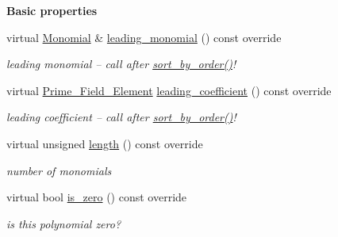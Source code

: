 \begin{Indent}\textbf{ Basic properties}\par
\begin{DoxyCompactItemize}
\item 
\mbox{\label{group__polygroup_ac858fe599295a6b20c2a2df1ead74068}} 
virtual \hyperlink{group__polygroup_class_monomial}{Monomial} \& \hyperlink{group__polygroup_ac858fe599295a6b20c2a2df1ead74068}{leading\+\_\+monomial} () const override
\begin{DoxyCompactList}\small\item\em leading monomial -- call after \hyperlink{group__polygroup_a41e751eee1614e26ebba39a9f81f7993}{sort\+\_\+by\+\_\+order()}! \end{DoxyCompactList}\item 
\mbox{\label{group__polygroup_a48c1d3abec70bb53e148ee7e14480ad6}} 
virtual \hyperlink{group___fields_group_class_prime___field___element}{Prime\+\_\+\+Field\+\_\+\+Element} \hyperlink{group__polygroup_a48c1d3abec70bb53e148ee7e14480ad6}{leading\+\_\+coefficient} () const override
\begin{DoxyCompactList}\small\item\em leading coefficient -- call after \hyperlink{group__polygroup_a41e751eee1614e26ebba39a9f81f7993}{sort\+\_\+by\+\_\+order()}! \end{DoxyCompactList}\item 
\mbox{\label{group__polygroup_a05caa373c56753d535caf24f4f2005df}} 
virtual unsigned \hyperlink{group__polygroup_a05caa373c56753d535caf24f4f2005df}{length} () const override
\begin{DoxyCompactList}\small\item\em number of monomials \end{DoxyCompactList}\item 
\mbox{\label{group__polygroup_a1a4c51dd399e62884acfd6f935057463}} 
virtual bool \hyperlink{group__polygroup_a1a4c51dd399e62884acfd6f935057463}{is\+\_\+zero} () const override
\begin{DoxyCompactList}\small\item\em is this polynomial zero? \end{DoxyCompactList}\item 
\mbox{\label{group__polygroup_af01f234c0897a5a01590f9b35e7e566f}} 

\end{DoxyCompactItemize}
\end{Indent}
